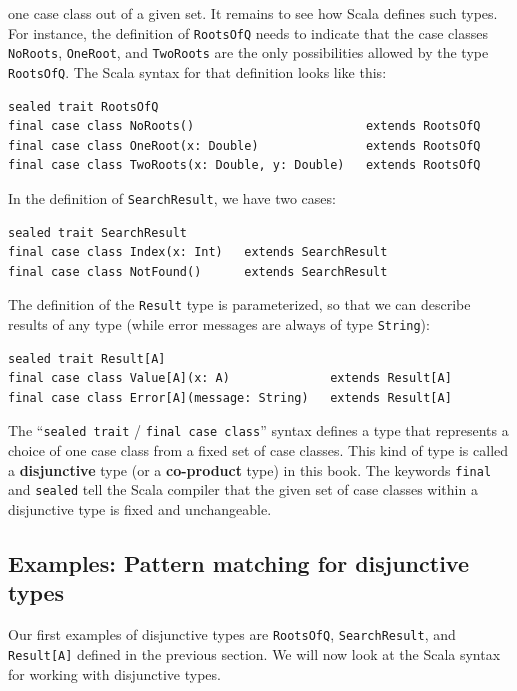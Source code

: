 one case class out of a given set. It remains to see how Scala defines
such types. For instance, the definition of \lstinline!RootsOfQ!
needs to indicate that the case classes \lstinline!NoRoots!, \lstinline!OneRoot!,
and \lstinline!TwoRoots! are the only possibilities allowed by the
type \lstinline!RootsOfQ!. The Scala syntax for that definition looks
like this:
\begin{lstlisting}
sealed trait RootsOfQ
final case class NoRoots()                        extends RootsOfQ
final case class OneRoot(x: Double)               extends RootsOfQ
final case class TwoRoots(x: Double, y: Double)   extends RootsOfQ
\end{lstlisting}
In the definition of \lstinline!SearchResult!, we have two cases:
\begin{lstlisting}
sealed trait SearchResult
final case class Index(x: Int)   extends SearchResult
final case class NotFound()      extends SearchResult
\end{lstlisting}
The definition of the \lstinline!Result! type is parameterized, so
that we can describe results of any type (while error messages are
always of type \lstinline!String!):
\begin{lstlisting}
sealed trait Result[A]
final case class Value[A](x: A)              extends Result[A]
final case class Error[A](message: String)   extends Result[A]
\end{lstlisting}

The \textsf{``}\lstinline!sealed trait! / \lstinline!final case class!\textsf{''}
syntax defines a type that represents a choice of one case class from
a fixed set of case classes. This kind of type is called a \textbf{disjunctive
}type (or a \textbf{co-product} type)
in this book. The keywords \lstinline!final! and \lstinline!sealed!
tell the Scala compiler that the given set of case classes within
a disjunctive type is fixed and unchangeable.

\subsection{Examples: Pattern matching for disjunctive types}

Our first examples of disjunctive types are \lstinline!RootsOfQ!,
\lstinline!SearchResult!, and \lstinline!Result[A]! defined in the
previous section. We will now look at the Scala syntax for working
with disjunctive types.

